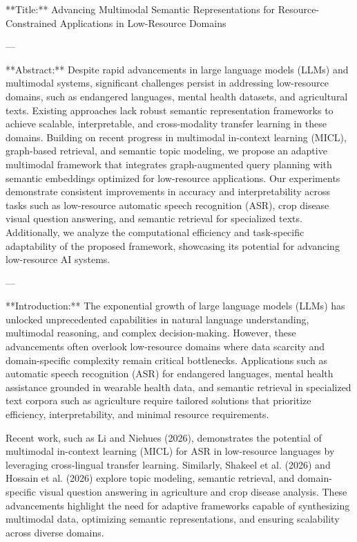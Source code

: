 **Title:**  
Advancing Multimodal Semantic Representations for Resource-Constrained Applications in Low-Resource Domains  

---

**Abstract:**  
Despite rapid advancements in large language models (LLMs) and multimodal systems, significant challenges persist in addressing low-resource domains, such as endangered languages, mental health datasets, and agricultural texts. Existing approaches lack robust semantic representation frameworks to achieve scalable, interpretable, and cross-modality transfer learning in these domains. Building on recent progress in multimodal in-context learning (MICL), graph-based retrieval, and semantic topic modeling, we propose an adaptive multimodal framework that integrates graph-augmented query planning with semantic embeddings optimized for low-resource applications. Our experiments demonstrate consistent improvements in accuracy and interpretability across tasks such as low-resource automatic speech recognition (ASR), crop disease visual question answering, and semantic retrieval for specialized texts. Additionally, we analyze the computational efficiency and task-specific adaptability of the proposed framework, showcasing its potential for advancing low-resource AI systems.  

---

**Introduction:**  
The exponential growth of large language models (LLMs) has unlocked unprecedented capabilities in natural language understanding, multimodal reasoning, and complex decision-making. However, these advancements often overlook low-resource domains where data scarcity and domain-specific complexity remain critical bottlenecks. Applications such as automatic speech recognition (ASR) for endangered languages, mental health assistance grounded in wearable health data, and semantic retrieval in specialized text corpora such as agriculture require tailored solutions that prioritize efficiency, interpretability, and minimal resource requirements.

Recent work, such as Li and Niehues (2026), demonstrates the potential of multimodal in-context learning (MICL) for ASR in low-resource languages by leveraging cross-lingual transfer learning. Similarly, Shakeel et al. (2026) and Hossain et al. (2026) explore topic modeling, semantic retrieval, and domain-specific visual question answering in agriculture and crop disease analysis. These advancements highlight the need for adaptive frameworks capable of synthesizing multimodal data, optimizing semantic representations, and ensuring scalability across diverse domains.

